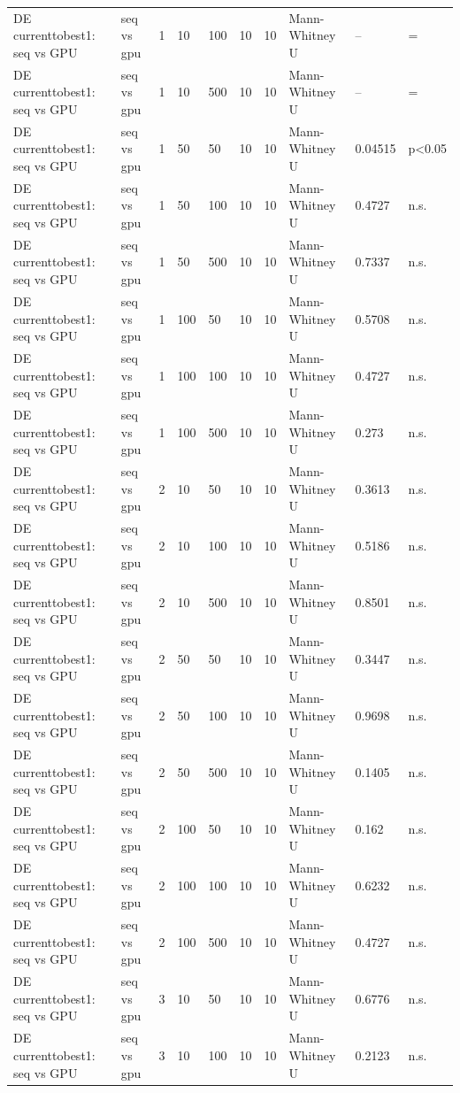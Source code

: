 \begin{table}[t]
\begin{tabular}{llllllllll}
DE currenttobest1: seq vs GPU & seq vs gpu & 1 & 10 & 100 & 10 & 10 & Mann-Whitney U & -- & = \\
DE currenttobest1: seq vs GPU & seq vs gpu & 1 & 10 & 500 & 10 & 10 & Mann-Whitney U & -- & = \\
DE currenttobest1: seq vs GPU & seq vs gpu & 1 & 50 & 50 & 10 & 10 & Mann-Whitney U & 0.04515 & p<0.05 \\
DE currenttobest1: seq vs GPU & seq vs gpu & 1 & 50 & 100 & 10 & 10 & Mann-Whitney U & 0.4727 & n.s. \\
DE currenttobest1: seq vs GPU & seq vs gpu & 1 & 50 & 500 & 10 & 10 & Mann-Whitney U & 0.7337 & n.s. \\
DE currenttobest1: seq vs GPU & seq vs gpu & 1 & 100 & 50 & 10 & 10 & Mann-Whitney U & 0.5708 & n.s. \\
DE currenttobest1: seq vs GPU & seq vs gpu & 1 & 100 & 100 & 10 & 10 & Mann-Whitney U & 0.4727 & n.s. \\
DE currenttobest1: seq vs GPU & seq vs gpu & 1 & 100 & 500 & 10 & 10 & Mann-Whitney U & 0.273 & n.s. \\
DE currenttobest1: seq vs GPU & seq vs gpu & 2 & 10 & 50 & 10 & 10 & Mann-Whitney U & 0.3613 & n.s. \\
DE currenttobest1: seq vs GPU & seq vs gpu & 2 & 10 & 100 & 10 & 10 & Mann-Whitney U & 0.5186 & n.s. \\
DE currenttobest1: seq vs GPU & seq vs gpu & 2 & 10 & 500 & 10 & 10 & Mann-Whitney U & 0.8501 & n.s. \\
DE currenttobest1: seq vs GPU & seq vs gpu & 2 & 50 & 50 & 10 & 10 & Mann-Whitney U & 0.3447 & n.s. \\
DE currenttobest1: seq vs GPU & seq vs gpu & 2 & 50 & 100 & 10 & 10 & Mann-Whitney U & 0.9698 & n.s. \\
DE currenttobest1: seq vs GPU & seq vs gpu & 2 & 50 & 500 & 10 & 10 & Mann-Whitney U & 0.1405 & n.s. \\
DE currenttobest1: seq vs GPU & seq vs gpu & 2 & 100 & 50 & 10 & 10 & Mann-Whitney U & 0.162 & n.s. \\
DE currenttobest1: seq vs GPU & seq vs gpu & 2 & 100 & 100 & 10 & 10 & Mann-Whitney U & 0.6232 & n.s. \\
DE currenttobest1: seq vs GPU & seq vs gpu & 2 & 100 & 500 & 10 & 10 & Mann-Whitney U & 0.4727 & n.s. \\
DE currenttobest1: seq vs GPU & seq vs gpu & 3 & 10 & 50 & 10 & 10 & Mann-Whitney U & 0.6776 & n.s. \\
DE currenttobest1: seq vs GPU & seq vs gpu & 3 & 10 & 100 & 10 & 10 & Mann-Whitney U & 0.2123 & n.s. \\

\end{tabular}
\end{table}
